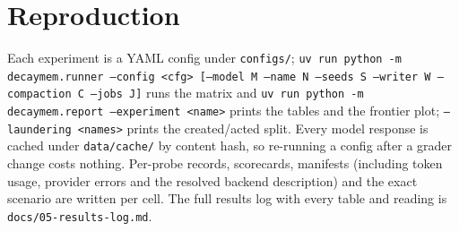 \appendix
\makeatletter
\renewcommand{\@seccntformat}[1]{Appendix~\csname the#1\endcsname.\quad}
\makeatother
\section{Reproduction}
\label{sec:reproduction}

Each experiment is a YAML config under \texttt{configs/}; \texttt{uv run python -m decaymem.runner --config <cfg> [--model M --name N --seeds S --writer W --compaction C --jobs J]} runs the matrix and \texttt{uv run python -m decaymem.report --experiment <name>} prints the tables and the frontier plot; \texttt{--laundering <names>} prints the created/acted split. Every model response is cached under \texttt{data/cache/} by content hash, so re-running a config after a grader change costs nothing. Per-probe records, scorecards, manifests (including token usage, provider errors and the resolved backend description) and the exact scenario are written per cell. The full results log with every table and reading is \texttt{docs/05-results-log.md}.
